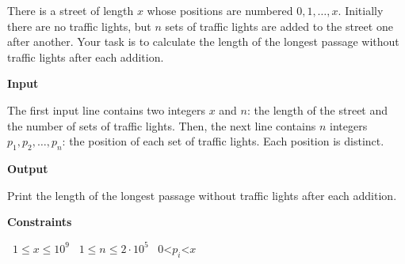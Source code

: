There is a street of length $x$ whose positions are numbered $0,1,\ldots,x$. Initially there are no traffic lights, but $n$ sets of traffic lights are added to the street one after another.
Your task is to calculate the length of the longest passage without traffic lights after each addition.

\vspace{0.3cm}\noindent\textbf{Input}

The first input line contains two integers $x$ and $n$: the length of the street and the number of sets of traffic lights.
Then, the next line contains $n$ integers $p_1,p_2,\ldots,p_n$: the position of each set of traffic lights. Each position is distinct.

\vspace{0.3cm}\noindent\textbf{Output}

Print the length of the longest passage without traffic lights after each addition.

\vspace{0.3cm}\noindent\textbf{Constraints}

\textbullet\ $1 \le x \le 10^9$
\textbullet\ $1 \le n \le 2 \cdot 10^5$
\textbullet\ $0 $<$ p_i $<$ x$